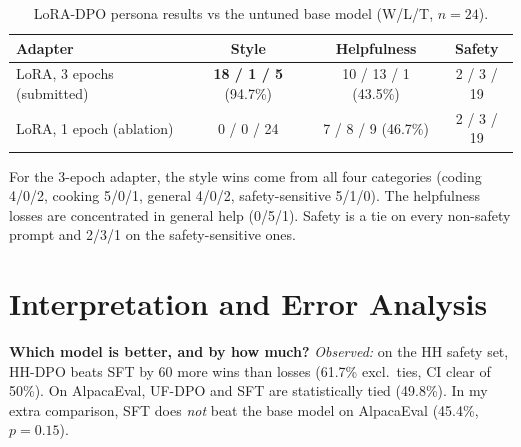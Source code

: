 \documentclass[10pt]{article}
\renewcommand{\_}{\oldunderscore\allowbreak}
\newcommand{\W}[1]{\textcolor{win}{\textbf{#1}}}
\begin{document}
\begin{table}[H]
\centering\small
\caption{LoRA-DPO persona results vs the untuned base model (W/L/T, $n{=}24$).}
\label{tab:persona}
\begin{tabular}{@{}l c c c@{}}
\toprule
Adapter & Style & Helpfulness & Safety \\
\midrule
LoRA, 3 epochs (submitted) & \W{18 / 1 / 5} (94.7\%) & 10 / 13 / 1 (43.5\%) & 2 / 3 / 19 \\
LoRA, 1 epoch (ablation) & 0 / 0 / 24 & 7 / 8 / 9 (46.7\%) & 2 / 3 / 19 \\
\bottomrule
\end{tabular}
\end{table}
\vspace{-3pt}
For the 3-epoch adapter, the style wins come from all four categories (coding 4/0/2, cooking 5/0/1, general 4/0/2, safety-sensitive 5/1/0). The helpfulness losses are concentrated in general help (0/5/1). Safety is a tie on every non-safety prompt and 2/3/1 on the safety-sensitive ones.

\section{Interpretation and Error Analysis}

\textbf{Which model is better, and by how much?}
\emph{Observed:} on the HH safety set, HH-DPO beats SFT by 60 more wins than losses (61.7\% excl.\ ties, CI clear of 50\%). On AlpacaEval, UF-DPO and SFT are statistically tied (49.8\%). In my extra comparison, SFT does \emph{not} beat the base model on AlpacaEval (45.4\%, $p{=}0.15$).
\end{document}

